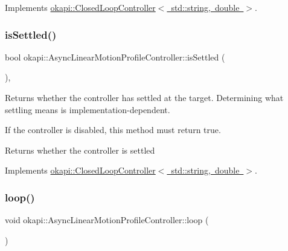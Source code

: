 Implements \mbox{\hyperlink{classokapi_1_1ClosedLoopController_a40bd4ec2b8c75503fbf6f494fd7cbe69}{okapi\+::\+Closed\+Loop\+Controller$<$ std\+::string, double $>$}}.

\mbox{\label{classokapi_1_1AsyncLinearMotionProfileController_aecfed2c6a0ead2c38253250e26ce17d4}} 
\subsubsection{\texorpdfstring{isSettled()}{isSettled()}}
{\footnotesize\ttfamily bool okapi\+::\+Async\+Linear\+Motion\+Profile\+Controller\+::is\+Settled (\begin{DoxyParamCaption}{ }\end{DoxyParamCaption})\hspace{0.3cm}{\ttfamily [override]}, {\ttfamily [virtual]}}

Returns whether the controller has settled at the target. Determining what settling means is implementation-\/dependent.

If the controller is disabled, this method must return true.

\begin{DoxyReturn}{Returns}
whether the controller is settled 
\end{DoxyReturn}


Implements \mbox{\hyperlink{classokapi_1_1ClosedLoopController_aed7aa0e94b6474c28314f8517d6cb4d8}{okapi\+::\+Closed\+Loop\+Controller$<$ std\+::string, double $>$}}.

\mbox{\label{classokapi_1_1AsyncLinearMotionProfileController_aee386f2d2697feff54005cf9e91a6e52}} 
\subsubsection{\texorpdfstring{loop()}{loop()}}
{\footnotesize\ttfamily void okapi\+::\+Async\+Linear\+Motion\+Profile\+Controller\+::loop (\begin{DoxyParamCaption}{ }\end{DoxyParamCaption})\hspace{0.3cm}{\ttfamily [protected]}}

